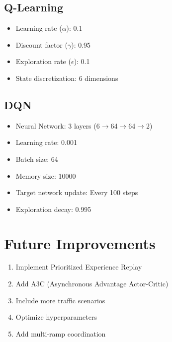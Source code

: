 \documentclass[12pt,a4paper]{article}
\begin{document}
\subsection{Q-Learning}
\begin{tcolorbox}[title=Q-Learning Parameters]
\begin{itemize}
    \item Learning rate ($\alpha$): 0.1
    \item Discount factor ($\gamma$): 0.95
    \item Exploration rate ($\epsilon$): 0.1
    \item State discretization: 6 dimensions
\end{itemize}
\end{tcolorbox}

\subsection{DQN}
\begin{tcolorbox}[title=DQN Parameters]
\begin{itemize}
    \item Neural Network: 3 layers (6$\rightarrow$64$\rightarrow$64$\rightarrow$2)
    \item Learning rate: 0.001
    \item Batch size: 64
    \item Memory size: 10000
    \item Target network update: Every 100 steps
    \item Exploration decay: 0.995
\end{itemize}
\end{tcolorbox}

\section{Future Improvements}
\begin{enumerate}
    \item Implement Prioritized Experience Replay
    \item Add A3C (Asynchronous Advantage Actor-Critic)
    \item Include more traffic scenarios
    \item Optimize hyperparameters
    \item Add multi-ramp coordination
\end{enumerate}
\end{document}

